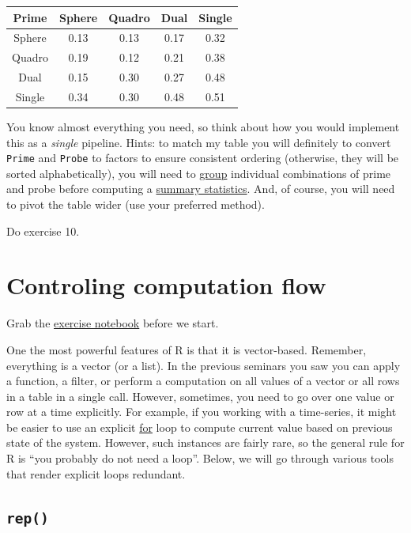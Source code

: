 \documentclass[
]{book}
\begin{document}
\begin{tabular}{c|c|c|c|c}
\hline
Prime & Sphere & Quadro & Dual & Single\\
\hline
Sphere & 0.13 & 0.13 & 0.17 & 0.32\\
\hline
Quadro & 0.19 & 0.12 & 0.21 & 0.38\\
\hline
Dual & 0.15 & 0.30 & 0.27 & 0.48\\
\hline
Single & 0.34 & 0.30 & 0.48 & 0.51\\
\hline
\end{tabular}

You know almost everything you need, so think about how you would implement this as a \emph{single} pipeline. Hints: to match my table you will definitely to convert \texttt{Prime} and \texttt{Probe} to factors to ensure consistent ordering (otherwise, they will be sorted alphabetically), you will need to \href{https://dplyr.tidyverse.org/reference/group_by.html}{group} individual combinations of prime and probe before computing a \href{https://dplyr.tidyverse.org/reference/summarise.html}{summary statistics}. And, of course, you will need to pivot the table wider (use your preferred method).

Do exercise 10.

\hypertarget{controling-computation-flow}{%
\chapter{Controling computation flow}\label{controling-computation-flow}}

Grab the \href{notebooks/Seminar\%2010\%20-\%20repetition.Rmd}{exercise notebook} before we start.

One the most powerful features of R is that it is vector-based. Remember, everything is a vector (or a list). In the previous seminars you saw you can apply a function, a filter, or perform a computation on all values of a vector or all rows in a table in a single call. However, sometimes, you need to go over one value or row at a time explicitly. For example, if you working with a time-series, it might be easier to use an explicit \href{https://stat.ethz.ch/R-manual/R-devel/library/base/html/Control.html}{for} loop to compute current value based on previous state of the system. However, such instances are fairly rare, so the general rule for R is ``you probably do not need a loop''. Below, we will go through various tools that render explicit loops redundant.

\hypertarget{rep}{%
\section{\texorpdfstring{\texttt{rep()}}{rep()}}\label{rep}}
\end{document}
